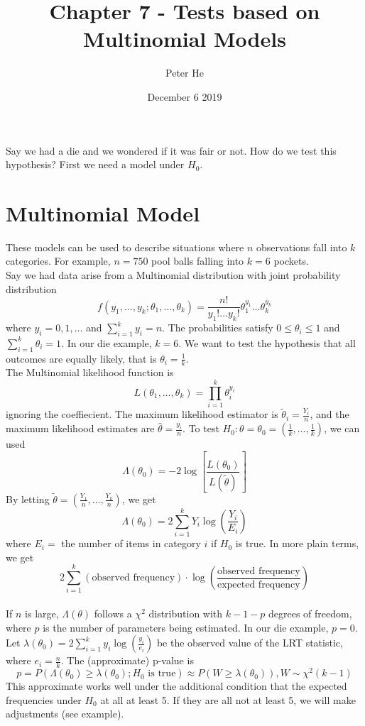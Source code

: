 \documentclass[12pt]{article}
\title{Chapter 7 - Tests based on Multinomial Models}
\author{Peter He}
\date{December 6 2019}
\begin{document}
\maketitle

Say we had a die and we wondered if it was fair or not. How do we test this hypothesis? First we need a model under $H_0$.

\section{Multinomial Model}
These models can be used to describe situations where $n$ observations fall into $k$ categories. For example, $n=750$ pool balls falling into $k=6$ pockets.\\
Say we had data arise from a Multinomial distribution with joint probability distribution \[f(y_1,\dots,y_k;\theta_1,\dots,\theta_k)=\frac{n!}{y_1!\dots y_k!}\theta_1^{y_1}\dots\theta_k^{y_k}\]
where $y_i=0,1,\dots$ and $\sum\limits_{i=1}^ky_i=n$. The probabilities satisfy $0\leq\theta_i\leq 1$ and $\sum\limits_{i=1}^k\theta_i=1$. In our die example, $k=6$. We want to test the hypothesis that all outcomes are equally likely, that is $\theta_i=\frac{1}{k}$.\\
The Multinomial likelihood function is \[L(\theta_1,\dots,\theta_k)=\prod_{i=1}^k\theta_i^{y_i}\] ignoring the coeffiecient. The maximum likelihood estimator is $\tilde\theta_i=\frac{Y_i}{n}$, and the maximum likelihood estimates are $\hat\theta=\frac{y_i}{n}$. To test $H_0:\theta=\theta_0=\left(\frac{1}{k},\dots,\frac{1}{k}\right)$, we can used
\[\Lambda(\theta_0)=-2\log\left[\frac{L(\theta_0)}{L(\tilde\theta)}\right]\] By letting $\tilde\theta=\left(\frac{Y_1}{n},\dots,\frac{Y_k}{n}\right)$, we get\[\Lambda(\theta_0)=2\sum_{i=1}^kY_i\log\left(\frac{Y_i}{E_i}\right)\] where $E_i=$ the number of items in category $i$ if $H_0$ is true. In more plain terms, we get \[2\sum_{i=1}^k(\text{observed frequency})\cdot\log\left(\frac{\text{observed frequency}}{\text{expected frequency}}\right)\]
\\
If $n$ is large, $\Lambda(\theta)$ follows a $\chi^2$ distribution with $k-1-p$ degrees of freedom, where $p$ is the number of parameters being estimated. In our die example, $p=0$. Let $\lambda(\theta_0)=2\sum\limits_{i=1}^ky_i\log\left(\frac{y_i}{e_i}\right)$ be the observed value of the LRT statistic, where $e_i=\frac{n}{k}$. The (approximate) p-value is \[p=P(\Lambda(\theta_0)\geq \lambda(\theta_0);H_0\text{ is true})\approx P(W\geq \lambda(\theta_0)), W\sim\chi^2(k-1)\]
This approximate works well under the additional condition that the expected frequencies under $H_0$ at all at least 5. If they are all not at least 5, we will make adjustments (see example).
\end{document}

